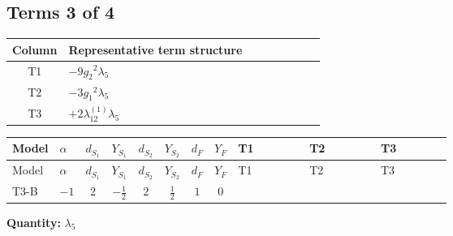 \documentclass[8pt]{article}
\begin{document}
\begin{landscape}
\subsection*{Terms 3 of 4}
\begin{center}
\begin{tabular}{@{}c >{\raggedright\arraybackslash}p{0.82\linewidth}@{}}
\toprule
Column & Representative term structure \\
\midrule
T1 & \(\displaystyle -9 {g_2}^2 {\lambda_5}\) \\
\midrule
T2 & \(\displaystyle -3 {g_1}^2 {\lambda_5}\) \\
\midrule
T3 & \(\displaystyle +2 {\lambda_{12}^{(1)}} {\lambda_5}\) \\
\midrule
\bottomrule
\end{tabular}
\end{center}
\smallskip
\tiny
\begin{longtable}{@{}llcccccc >{\raggedright\arraybackslash}p{0.21\linewidth} >{\raggedright\arraybackslash}p{0.21\linewidth} >{\raggedright\arraybackslash}p{0.21\linewidth}@{}}
\toprule
Model & $\alpha$ & $d_{S_1}$ & $Y_{S_1}$ & $d_{S_2}$ & $Y_{S_2}$ & $d_F$ & $Y_F$ & T1 & T2 & T3 \\
\midrule
\endfirsthead
\toprule
Model & $\alpha$ & $d_{S_1}$ & $Y_{S_1}$ & $d_{S_2}$ & $Y_{S_2}$ & $d_F$ & $Y_F$ & T1 & T2 & T3 \\
\midrule
\endhead
T3-B & $-1$ & $2$ & $-\frac{1}{2}$ & $2$ & $\frac{1}{2}$ & $1$ & $0$ & \scriptsize\adjustbox{max width=\linewidth}{$\begin{gathered} -9 {g_2}^2 {\lambda_5}\end{gathered}$} & \scriptsize\adjustbox{max width=\linewidth}{$\begin{gathered} -3 {g_1}^2 {\lambda_5}\end{gathered}$} & \scriptsize\adjustbox{max width=\linewidth}{$\begin{gathered} +2 {\lambda_{12}^{(1)}} {\lambda_5}\end{gathered}$} \\
\midrule
\bottomrule
\end{longtable}
\clearpage
\noindent\textbf{Quantity: }$\lambda_5$\par\smallskip

\end{landscape}
\end{document}
